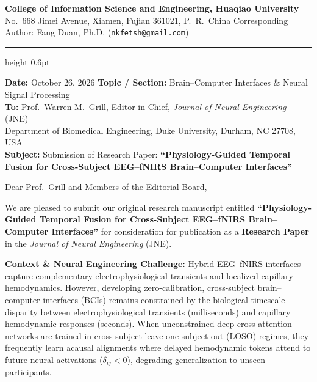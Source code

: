 \documentclass[10pt,a4paper]{article}
\begin{document}
\thispagestyle{empty}

\noindent
\textbf{College of Information Science and Engineering, Huaqiao University}\\
{\small No.~668 Jimei Avenue, Xiamen, Fujian 361021, P.~R.~China \hfill Corresponding Author: Fang Duan, Ph.D. (\texttt{nkfetsh@gmail.com})}
\vspace{0.2ex}
\hrule height 0.6pt
\vspace{0.4ex}

\noindent
\textbf{Date:} October 26, 2026 \hfill \textbf{Topic / Section:} Brain--Computer Interfaces \& Neural Signal Processing\\[0.3ex]
\textbf{To:} Prof.~Warren M.~Grill, Editor-in-Chief, \textit{Journal of Neural Engineering} (JNE)\\
 Department of Biomedical Engineering, Duke University, Durham, NC 27708, USA\\[0.3ex]
\textbf{Subject:} Submission of Research Paper: \textbf{``Physiology-Guided Temporal Fusion for Cross-Subject EEG--fNIRS Brain--Computer Interfaces''}

\vspace{0.4ex}
\noindent Dear Prof.~Grill and Members of the Editorial Board,

\smallskip
We are pleased to submit our original research manuscript entitled \textbf{``Physiology-Guided Temporal Fusion for Cross-Subject EEG--fNIRS Brain--Computer Interfaces''} for consideration for publication as a \textbf{Research Paper} in the \textit{Journal of Neural Engineering} (JNE).

\smallskip
\noindent\textbf{Context \& Neural Engineering Challenge:}
Hybrid EEG--fNIRS interfaces capture complementary electrophysiological transients and localized capillary hemodynamics. However, developing zero-calibration, cross-subject brain--computer interfaces (BCIs) remains constrained by the biological timescale disparity between electrophysiological transients (milliseconds) and capillary hemodynamic responses (seconds). When unconstrained deep cross-attention networks are trained in cross-subject leave-one-subject-out (LOSO) regimes, they frequently learn acausal alignments where delayed hemodynamic tokens attend to future neural activations ($\delta_{ij} < 0$), degrading generalization to unseen participants.
\end{document}
